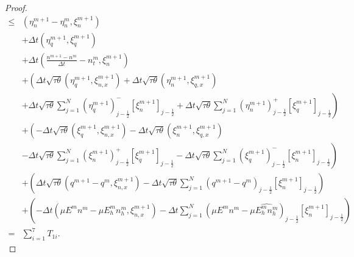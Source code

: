 \begin{proof}
$$\begin{aligned}
            \leq & \left(\eta_{n}^{m+1}-\eta_{n}^{m}, \xi_{n}^{m+1}\right)                                                                                                                                                                                                                               \\
                 & +\Delta t\left(\eta_{q}^{m+1}, \xi_{q}^{m+1}\right)                                                                                                                                                                                                                                   \\
                 & +\Delta t\left(\frac{n^{m+1}-n^{m}}{\Delta t}-n_{t}^{m}, \xi_{n}^{m+1}\right)                                                                                                                                                                                                         \\
                 & +\left(\Delta t \sqrt{\tau \theta}\left(\eta_{q}^{m+1}, \xi_{n, x}^{m+1}\right)+\Delta t \sqrt{\tau \theta}\left(\eta_{n}^{m+1}, \xi_{q, x}^{m+1}\right)\right.                                                                                                                       \\
                 & \left.+\Delta t \sqrt{\tau \theta} \sum_{j=1}^{N}\left(\eta_{q}^{m+1}\right)_{j-\frac{1}{2}}^{-}\left[\xi_{n}^{m+1}\right]_{j-\frac{1}{2}}+\Delta t \sqrt{\tau \theta} \sum_{j=1}^{N}\left(\eta_{n}^{m+1}\right)_{j-\frac{1}{2}}^{+}\left[\xi_{q}^{m+1}\right]_{j-\frac{1}{2}}\right) \\
                 & +\left(-\Delta t \sqrt{\tau \theta}\left(\xi_{q}^{m+1}, \xi_{n, x}^{m+1}\right)-\Delta t \sqrt{\tau \theta}\left(\xi_{n}^{m+1}, \xi_{q, x}^{m+1}\right)\right.                                                                                                                        \\
                 & \left.-\Delta t \sqrt{\tau \theta} \sum_{j=1}^{N}\left(\xi_{n}^{m+1}\right)_{j-\frac{1}{2}}^{+}\left[\xi_{q}^{m+1}\right]_{j-\frac{1}{2}}-\Delta t \sqrt{\tau \theta} \sum_{j=1}^{N}\left(\xi_{q}^{m+1}\right)_{j-\frac{1}{2}}^{-}\left[\xi_{n}^{m+1}\right]_{j-\frac{1}{2}}\right)   \\
                 & +\left(\Delta t \sqrt{\tau \theta}\left(q^{m+1}-q^{m}, \xi_{n, x}^{m+1}\right)-\Delta t \sqrt{\tau \theta} \sum_{j=1}^{N}\left(q^{m+1}-q^{m}\right)_{j-\frac{1}{2}}\left[\xi_{n}^{m+1}\right]_{j-\frac{1}{2}}\right)                                                                  \\
                 & +\left(-\Delta t\left(\mu E^{m} n^{m}-\mu E_{h}^{m} n_{h}^{m}, \xi_{n, x}^{m+1}\right)-\Delta t \sum_{j=1}^{N}\left(\mu E^{m} n^{m}-\mu \widehat{E_{h}^{m} n_{h}^{m}}\right)_{j-\frac{1}{2}}\left[\xi_{n}^{m+1}\right]_{j-\frac{1}{2}}\right)                                         \\
            =    & \sum_{i=1}^{7} T_{1 i} .
        \end{aligned}
    $$


\end{proof}
